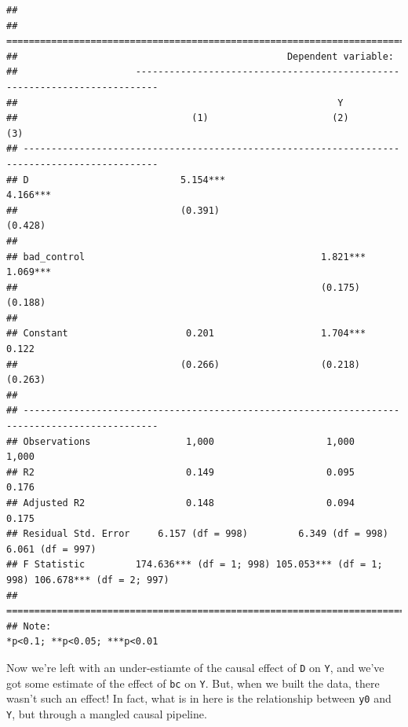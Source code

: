 \documentclass[
]{book}
\begin{document}
\begin{verbatim}
## 
## ==============================================================================================
##                                                Dependent variable:                            
##                     --------------------------------------------------------------------------
##                                                         Y                                     
##                               (1)                      (2)                      (3)           
## ----------------------------------------------------------------------------------------------
## D                           5.154***                                          4.166***        
##                             (0.391)                                           (0.428)         
##                                                                                               
## bad_control                                          1.821***                 1.069***        
##                                                      (0.175)                  (0.188)         
##                                                                                               
## Constant                     0.201                   1.704***                  0.122          
##                             (0.266)                  (0.218)                  (0.263)         
##                                                                                               
## ----------------------------------------------------------------------------------------------
## Observations                 1,000                    1,000                    1,000          
## R2                           0.149                    0.095                    0.176          
## Adjusted R2                  0.148                    0.094                    0.175          
## Residual Std. Error     6.157 (df = 998)         6.349 (df = 998)         6.061 (df = 997)    
## F Statistic         174.636*** (df = 1; 998) 105.053*** (df = 1; 998) 106.678*** (df = 2; 997)
## ==============================================================================================
## Note:                                                              *p<0.1; **p<0.05; ***p<0.01
\end{verbatim}

Now we're left with an under-estiamte of the causal effect of \texttt{D}
on \texttt{Y}, and we've got some estimate of the effect of \texttt{bc}
on \texttt{Y}. But, when we built the data, there wasn't such an effect!
In fact, what is in here is the relationship between \texttt{y0} and
\texttt{Y}, but through a mangled causal pipeline.
\end{document}
